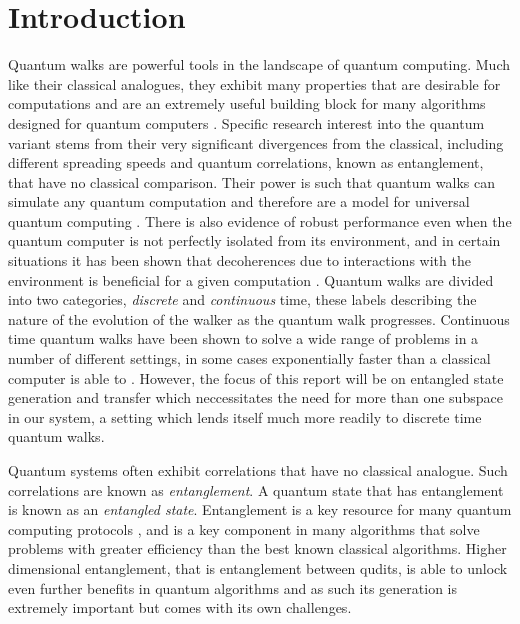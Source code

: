 \section{Introduction} 
Quantum walks are powerful tools in the landscape of quantum computing. 
Much like their classical analogues, they exhibit many properties that are desirable for computations and are an extremely useful building block for many algorithms designed for quantum computers \cite{shenvi2003}. 
Specific research interest into the quantum variant stems from their very significant divergences from the classical, including different spreading speeds and quantum correlations, known as entanglement, that have no classical comparison. 
Their power is such that quantum walks can simulate any quantum computation and therefore are a model for universal quantum computing \cite{Childs_2009}.
There is also evidence of robust performance even when the quantum computer is not perfectly isolated from its environment, and in certain situations it has been shown that decoherences due to interactions with the environment is beneficial for a given computation \cite{KENDON_2007}. 
Quantum walks are divided into two categories, \emph{discrete} and \emph{continuous} time, these labels describing the nature of the evolution of the walker as the quantum walk progresses.
Continuous time quantum walks have been shown to solve a wide range of problems in a number of different settings, in some cases exponentially faster than a classical computer is able to \cite{Childs_2003}. 
However, the focus of this report will be on entangled state generation and transfer which neccessitates the need for more than one subspace in our system, a setting which lends itself much more readily to discrete time quantum walks.\newline

Quantum systems often exhibit correlations that have no classical analogue. Such correlations are known as \emph{entanglement}. 
A quantum state that has entanglement is known as an \emph{entangled state}. 
Entanglement is a key resource for many quantum computing protocols \cite{qkd,Superdense,qteleport}, and is a key component in many algorithms that solve problems with greater efficiency than the best known classical algorithms. 
Higher dimensional entanglement, that is entanglement between qudits, is able to unlock even further benefits in quantum algorithms and as such its generation is extremely important but comes with its own challenges. \newline

